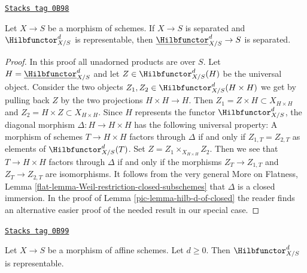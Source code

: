 \begin{lemma}
\label{pic-lemma-hilb-d-separated}
\href{https://stacks.math.columbia.edu/tag/0B98}{\texttt{Stacks tag 0B98}}

Let $X \to S$ be a morphism of schemes. If $X \to S$ is separated and
$\Hilbfunctor^d_{X/S}$ is representable,
then $\underline{\Hilbfunctor}^d_{X/S} \to S$ is separated.
\end{lemma}

\begin{proof}

In this proof all unadorned products are over $S$.
Let $H = \underline{\Hilbfunctor}^d_{X/S}$ and let
$Z \in \Hilbfunctor^d_{X/S}(H)$ be the universal object.
Consider the two objects $Z_1, Z_2 \in \Hilbfunctor^d_{X/S}(H \times H)$
we get by pulling back $Z$ by the two projections $H \times H \to H$.
Then $Z_1 = Z \times H \subset X_{H \times H}$ and $Z_2 = H \times Z
\subset X_{H \times H}$. Since $H$ represents the functor
$\Hilbfunctor^d_{X/S}$, the diagonal morphism $\Delta : H \to H \times H$
has the following universal property: A morphism of schemes
$T \to H \times H$ factors through $\Delta$ if and only if
$Z_{1, T} = Z_{2, T}$ as elements of $\Hilbfunctor^d_{X/S}(T)$.
Set $Z = Z_1 \times_{X_{H \times H}} Z_2$. Then we see that
$T \to H \times H$ factors through $\Delta$ if and only if
the morphisms $Z_T \to Z_{1, T}$ and $Z_T \to Z_{2, T}$ are
isomorphisms. It follows from the very general
More on Flatness, Lemma \ref{flat-lemma-Weil-restriction-closed-subschemes}
that $\Delta$ is a closed immersion. In the proof of
Lemma \ref{pic-lemma-hilb-d-of-closed}
the reader finds an alternative easier proof of the needed result
in our special case.
\end{proof}

\begin{lemma}[Hilb d An]
\label{pic-lemma-hilb-d-An}
\href{https://stacks.math.columbia.edu/tag/0B99}{\texttt{Stacks tag 0B99}}

Let $X \to S$ be a morphism of affine schemes. Let $d \geq 0$. Then
$\Hilbfunctor^d_{X/S}$ is representable.
\end{lemma}

